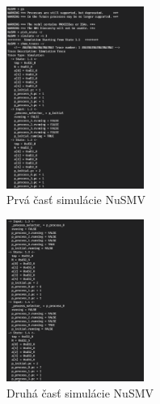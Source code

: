 \begin{figure}[H]
    \centerline{\includegraphics[width=0.4\textwidth]{images/nusmv1}}
    \caption[Prvá časť simulácie NuSMV]{Prvá časť simulácie NuSMV}
    \label{img:nusmv1}
\end{figure}

\begin{figure}[H]
    \centerline{\includegraphics[width=0.4\textwidth]{images/nusmv2}}
    \caption[Druhá časť simulácie NuSMV]{Druhá časť simulácie NuSMV}
    \label{img:nusmv2}
\end{figure}